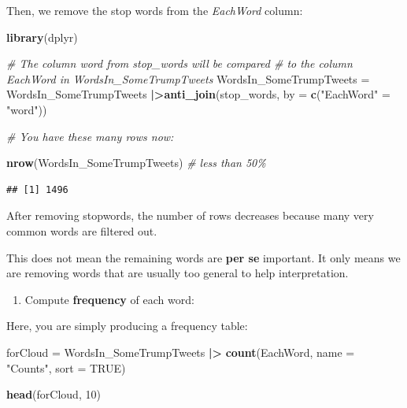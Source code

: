 \documentclass[
]{article}
\newenvironment{Shaded}{\begin{snugshade}}{\end{snugshade}}
\newcommand{\AttributeTok}[1]{\textcolor[rgb]{0.13,0.29,0.53}{#1}}
\newcommand{\CommentTok}[1]{\textcolor[rgb]{0.56,0.35,0.01}{\textit{#1}}}
\newcommand{\ConstantTok}[1]{\textcolor[rgb]{0.56,0.35,0.01}{#1}}
\newcommand{\DecValTok}[1]{\textcolor[rgb]{0.00,0.00,0.81}{#1}}
\newcommand{\FunctionTok}[1]{\textcolor[rgb]{0.13,0.29,0.53}{\textbf{#1}}}
\newcommand{\NormalTok}[1]{#1}
\newcommand{\OtherTok}[1]{\textcolor[rgb]{0.56,0.35,0.01}{#1}}
\newcommand{\SpecialCharTok}[1]{\textcolor[rgb]{0.81,0.36,0.00}{\textbf{#1}}}
\newcommand{\StringTok}[1]{\textcolor[rgb]{0.31,0.60,0.02}{#1}}
\providecommand{\tightlist}{%
  \setlength{\itemsep}{0pt}\setlength{\parskip}{0pt}}
\begin{document}
Then, we remove the stop words from the \emph{EachWord} column:

\begin{Shaded}
\begin{Highlighting}[]
\FunctionTok{library}\NormalTok{(dplyr)}

 \CommentTok{\# The column \textquotesingle{}word\textquotesingle{} from \textquotesingle{}stop\_words\textquotesingle{} will be compared \# to the column \textquotesingle{}EachWord\textquotesingle{} in \textquotesingle{}WordsIn\_SomeTrumpTweets\textquotesingle{} }
\NormalTok{WordsIn\_SomeTrumpTweets }\OtherTok{=}\NormalTok{ WordsIn\_SomeTrumpTweets }\SpecialCharTok{|\textgreater{}}\FunctionTok{anti\_join}\NormalTok{(stop\_words,}
                                             \AttributeTok{by =} \FunctionTok{c}\NormalTok{(}\StringTok{"EachWord"} \OtherTok{=} \StringTok{"word"}\NormalTok{))}

\CommentTok{\# You have these many rows now:}

\FunctionTok{nrow}\NormalTok{(WordsIn\_SomeTrumpTweets) }\CommentTok{\# less than 50\%}
\end{Highlighting}
\end{Shaded}

\begin{verbatim}
## [1] 1496
\end{verbatim}

After removing stopwords, the number of rows decreases because many very
common words are filtered out.

This does not mean the remaining words are \textbf{per se} important. It
only means we are removing words that are usually too general to help
interpretation.

\begin{enumerate}
\def\labelenumi{\arabic{enumi}.}
\setcounter{enumi}{4}
\tightlist
\item
  Compute \textbf{frequency} of each word:
\end{enumerate}

Here, you are simply producing a frequency table:

\begin{Shaded}
\begin{Highlighting}[]
\NormalTok{forCloud }\OtherTok{=}\NormalTok{ WordsIn\_SomeTrumpTweets }\SpecialCharTok{|\textgreater{}}
  \FunctionTok{count}\NormalTok{(EachWord, }\AttributeTok{name =} \StringTok{"Counts"}\NormalTok{, }\AttributeTok{sort =} \ConstantTok{TRUE}\NormalTok{)}

\FunctionTok{head}\NormalTok{(forCloud, }\DecValTok{10}\NormalTok{)}
\end{Highlighting}
\end{Shaded}
\end{document}
